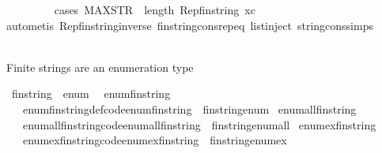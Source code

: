 \begin{isabellebody}
\ \ \ \ \ \ \ \ \isamarkupfalse%
{\isacharparenleft}cases\ {\isachardoublequoteopen}MAX{\isacharunderscore}STR\ {\isasymle}\ length\ {\isacharparenleft}Rep{\isacharunderscore}fin{\isacharunderscore}string\ xc{\isacharparenright}{\isachardoublequoteclose}{\isacharparenright}\ \isanewline
\ \ \ \ \ \ \ \ \ \isamarkupfalse%
{\isacharparenleft}auto{\isacharcomma}metis\ Rep{\isacharunderscore}fin{\isacharunderscore}string{\isacharunderscore}inverse\ fin{\isacharunderscore}string{\isacharunderscore}cons{\isachardot}rep{\isacharunderscore}eq\ list{\isachardot}inject\ string{\isacharunderscore}cons{\isachardot}simps{\isacharparenright}\isanewline
\ \ \ \ \ \ \isamarkupfalse%
\isanewline
\ \ \isamarkupfalse%
%
\endisatagproof
{\isafoldproof}%
%
\isadelimproof
%
\endisadelimproof
%
\begin{isamarkuptext}%
Finite strings are an enumeration type%
\end{isamarkuptext}\isamarkuptrue%
\isamarkupfalse%
\ fin{\isacharunderscore}string\ {\isacharcolon}{\isacharcolon}\ enum\ \isanewline
{}\isamarkupfalse%
\ enum{\isacharunderscore}fin{\isacharunderscore}string\ \isanewline
\ \ \ enum{\isacharunderscore}fin{\isacharunderscore}string{\isacharunderscore}def{\isacharbrackleft}code{\isacharbrackright}{\isacharcolon}{\isachardoublequoteopen}enum{\isacharunderscore}fin{\isacharunderscore}string\ {\isasymequiv}\ fin{\isacharunderscore}string{\isacharunderscore}enum{\isachardoublequoteclose}\isanewline
{}\isamarkupfalse%
\ enum{\isacharunderscore}all{\isacharunderscore}fin{\isacharunderscore}string\isanewline
\ \ \ enum{\isacharunderscore}all{\isacharunderscore}fin{\isacharunderscore}string{\isacharbrackleft}code{\isacharbrackright}{\isacharcolon}{\isachardoublequoteopen}enum{\isacharunderscore}all{\isacharunderscore}fin{\isacharunderscore}string\ {\isasymequiv}\ fin{\isacharunderscore}string{\isacharunderscore}enum{\isacharunderscore}all{\isachardoublequoteclose}\isanewline
{}\isamarkupfalse%
\ enum{\isacharunderscore}ex{\isacharunderscore}fin{\isacharunderscore}string\isanewline
\ \ \ enum{\isacharunderscore}ex{\isacharunderscore}fin{\isacharunderscore}string{\isacharbrackleft}code{\isacharbrackright}{\isacharcolon}{\isachardoublequoteopen}enum{\isacharunderscore}ex{\isacharunderscore}fin{\isacharunderscore}string\ {\isasymequiv}\ fin{\isacharunderscore}string{\isacharunderscore}enum{\isacharunderscore}ex{\isachardoublequoteclose}\isanewline

\end{isabellebody}

